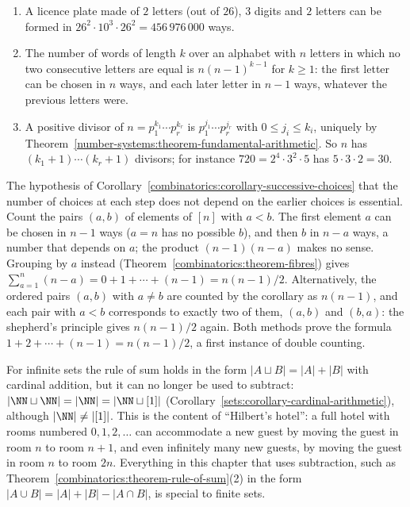\begin{example}\label{combinatorics:example-rule-of-product}
\begin{enumerate}
\item A licence plate made of $2$ letters (out of $26$), $3$ digits and $2$ letters can be formed in $26^2 \cdot 10^3 \cdot 26^2 = 456\,976\,000$ ways.
\item The number of words of length $k$ over an alphabet with $n$ letters in which no two consecutive letters are equal is $n(n - 1)^{k-1}$ for $k \geq 1$: the first letter can be chosen in $n$
ways, and each later letter in $n - 1$ ways, whatever the previous letters were.
\item A positive divisor of $n = p_1^{k_1} \cdots p_r^{k_r}$ is $p_1^{j_1} \cdots p_r^{j_r}$ with $0 \leq j_i \leq k_i$, uniquely by Theorem~\ref{number-systems:theorem-fundamental-arithmetic}. So $n$
has $(k_1 + 1) \cdots (k_r + 1)$ divisors; for instance $720 = 2^4 \cdot 3^2 \cdot 5$ has $5 \cdot 3 \cdot 2 = 30$.
\end{enumerate}
\end{example}

\begin{counterexample}\label{combinatorics:counterexample-dependent-choices}
The hypothesis of Corollary~\ref{combinatorics:corollary-successive-choices} that the number of choices at each step does not depend on the earlier choices is essential. Count the pairs $(a, b)$ of
elements of $[n]$ with $a < b$. The first element $a$ can be chosen in $n - 1$ ways ($a = n$ has no possible $b$), and then $b$ in $n - a$ ways, a number that depends on $a$; the product
$(n - 1)(n - a)$ makes no sense. Grouping by $a$ instead (Theorem~\ref{combinatorics:theorem-fibres}) gives $\sum_{a=1}^{n}(n - a) = 0 + 1 + \cdots + (n - 1) = n(n - 1)/2$. Alternatively, the ordered pairs
$(a, b)$ with $a \neq b$ are counted by the corollary as $n(n - 1)$, and each pair with $a < b$ corresponds to exactly two of them, $(a, b)$ and $(b, a)$: the shepherd's principle gives $n(n - 1)/2$
again. Both methods prove the formula $1 + 2 + \cdots + (n - 1) = n(n - 1)/2$, a first instance of double counting.
\end{counterexample}

\begin{counterexample}\label{combinatorics:counterexample-infinite-sum}
For infinite sets the rule of sum holds in the form $|A \sqcup B| = |A| + |B|$ with cardinal addition, but it can no longer be used to subtract: $|\NN \sqcup \NN| = |\NN| = |\NN \sqcup [1]|$
(Corollary~\ref{sets:corollary-cardinal-arithmetic}), although $|\NN| \neq |[1]|$. This is the content of ``Hilbert's hotel'': a full hotel with rooms numbered $0, 1, 2, \ldots$ can accommodate a new
guest by moving the guest in room $n$ to room $n + 1$, and even infinitely many new guests, by moving the guest in room $n$ to room $2n$. Everything in this chapter that uses subtraction, such as
Theorem~\ref{combinatorics:theorem-rule-of-sum}(2) in the form $|A \cup B| = |A| + |B| - |A \cap B|$, is special to finite sets.
\end{counterexample}

